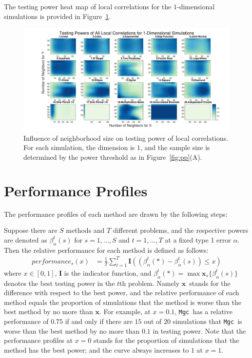 \documentclass[11pt]{article}
\providecommand{\sct}[1]{{\sc \texttt{#1}}}
\providecommand{\mb}[1]{\boldsymbol{#1}}
\newcommand{\Mgc}{\sct{Mgc}}
\newcommand{\mbx}{\ensuremath{\mb{x}}}
\begin{document}
The testing power heat map of local correlations for the $1$-dimensional simulations is provided in Figure~\ref{figSim2}.
\begin{figure}[htbp]
\includegraphics[width=1.0\textwidth]{Figures/Fig1DHeat}
\caption{Influence of neighborhood size on testing power of local correlations. For each simulation, the dimension is $1$, and the sample size is determined by the power threshold as in Figure~\ref{fig:pp}(A).
}
\label{figSim2}
\end{figure}

\section{Performance Profiles}
\label{appen:profiles}
The performance profiles of each method are drawn by the following steps:

Suppose there are $S$ methods and $T$ different problems, and the respective powers are denoted as $\beta_{\alpha}^{t}(s)$ for $s=1,\ldots,S$ and $t=1,\ldots,T$ at a fixed type 1 error $\alpha$. Then the relative performance for each method is defined as follows:
\begin{align*}
performance_{s}(x) &= \frac{1}{T} \sum_{t=1}^{T} \mb{I}((\beta_{\alpha}^{t}(*)-\beta_{\alpha}^{t}(s)) \leq x)
\end{align*}
where $x \in [0,1]$, $\mb{I}$ is the indicator function, and $\beta_{\alpha}^{t}(*) =\max \mbx_{s} \{\beta_{\alpha}^{t}(s)\}$ denotes the best testing power in the $t$th problem. Namely \mbx~stands for the difference with respect to the best power, and the relative performance of each method equals the proportion of simulations that the method is worse than the best method by no more than \mbx. For example, at $x=0.1$, \Mgc~has a relative performance of $0.75$ if and only if there are $15$ out of $20$ simulations that \Mgc~is worse than the best method by no more than $0.1$ in testing power. Note that the performance profiles at $x=0$ stands for the proportion of simulations that the method has the best power; and the curve always increases to $1$ at $x=1$. 
\end{document}
